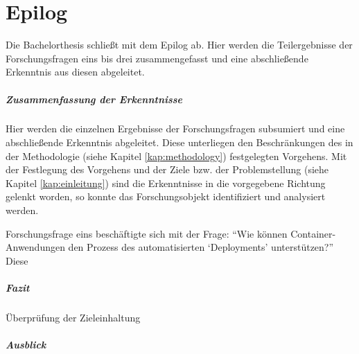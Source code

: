 \chapter{Epilog} \label{kritischeBetrachtung}
Die Bachelorthesis schließt mit dem Epilog ab. Hier werden die Teilergebnisse der Forschungsfragen eins bis drei zusammengefasst und eine abschließende Erkenntnis aus diesen abgeleitet. 
\paragraph{Zusammenfassung der Erkenntnisse}
Hier werden die einzelnen Ergebnisse der Forschungsfragen subsumiert und eine abschließende Erkenntnis abgeleitet. Diese unterliegen den Beschränkungen des in der Methodologie (siehe Kapitel \vref{kap:methodology}) festgelegten Vorgehens. Mit der Festlegung des Vorgehens und der Ziele bzw. der Problemstellung (siehe Kapitel \vref{kap:einleitung}) sind die Erkenntnisse in die vorgegebene Richtung gelenkt worden, so konnte das Forschungsobjekt identifiziert und analysiert werden.
\par
Forschungsfrage eins beschäftigte sich mit der Frage: \enquote{Wie können Container-Anwendungen den Prozess des automatisierten \enquote{Deployments} unterstützen?} Diese

\paragraph{Fazit}
Überprüfung der Zieleinhaltung
\paragraph{Ausblick}